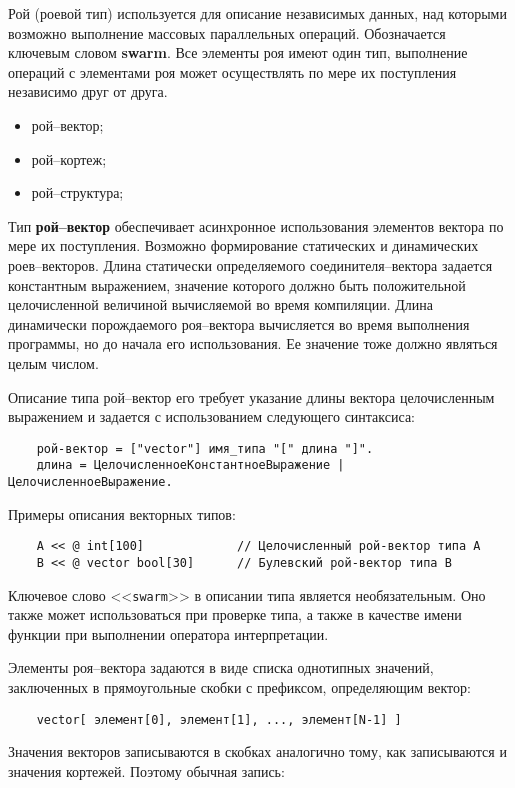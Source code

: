 {Рой (роевой тип) используется для описание независимых данных, над которыми возможно выполнение массовых параллельных операций. Обозначается ключевым словом \textbf{swarm}. Все элементы роя имеют один тип, выполнение операций с элементами роя может осуществлять по мере их поступления независимо друг от друга.

\begin{itemize}
    \item рой--вектор;
    \item рой--кортеж;
    \item рой--структура;
\end{itemize}

Тип \textbf{рой--вектор} обеспечивает асинхронное использования элементов вектора по мере их поступления. Возможно формирование статических и динамических роев--векторов. Длина статически определяемого соединителя--вектора задается константным выражением, значение которого должно быть положительной целочисленной величиной вычисляемой во время компиляции. Длина динамически порождаемого роя--вектора вычисляется во время выполнения программы, но до начала его использования. Ее значение тоже должно являться целым числом.

Описание типа рой--вектор его требует указание длины вектора целочисленным выражением и задается с использованием следующего синтаксиса:

\begin{verbatim}
    рой-вектор = ["vector"] имя_типа "[" длина "]".
    длина = ЦелочисленноеКонстантноеВыражение | ЦелочисленноеВыражение.
\end{verbatim}

Примеры описания векторных типов:

\begin{verbatim}
    A << @ int[100]             // Целочисленный рой-вектор типа А
    B << @ vector bool[30]      // Булевский рой-вектор типа B
\end{verbatim}

Ключевое слово <<\verb|swarm|>> в описании типа является необязательным. Оно также может использоваться при проверке типа, а также в качестве имени функции при выполнении оператора интерпретации.

Элементы роя--вектора задаются в виде списка однотипных значений, заключенных в прямоугольные скобки с префиксом, определяющим вектор:

\begin{verbatim}
    vector[ элемент[0], элемент[1], ..., элемент[N-1] ]
\end{verbatim}
Значения векторов записываются в скобках аналогично тому, как записываются и значения кортежей. Поэтому обычная запись:

}
